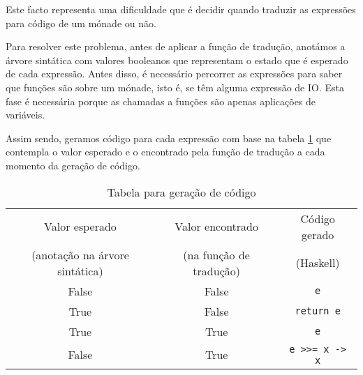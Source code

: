 \begin{itemize}
Este facto representa uma dificuldade que é decidir quando traduzir as expressões para código de um mónade ou não. %

Para resolver este problema, antes de aplicar a função de tradução, anotámos a árvore sintática com valores booleanos que representam o estado que é esperado de cada expressão. Antes disso, é necessário percorrer as expressões para saber que funções são sobre um mónade, isto é, se têm alguma expressão de IO. Esta fase é necessária porque as chamadas a funções são apenas aplicações de variáveis.

Assim sendo, geramos código para cada expressão com base na tabela \ref{tab:monad} que contempla o valor esperado e o encontrado pela função de tradução a cada momento da geração de código.




\begin{table}
\begin{center}
  \begin{tabular}[ht!]{| c | c | c |}
    \hline  
    \quad Valor esperado \quad&\quad Valor encontrado \quad&\quad Código gerado \quad\\
    \quad (anotação na árvore sintática) \quad&\quad (na função de tradução) \quad& (Haskell) \quad\\\hline
    False & False & \lstinline|e| \\
    True & False & \lstinline|return e| \\
    True & True & \lstinline|e| \\
    False & True & \lstinline|e >>= x -> x| \\
    \hline
  \end{tabular}
  \vspace{0.2cm}
  \caption{Tabela para geração de código}
  \label{tab:monad}
\end{center}
\end{table}


\end{itemize}
